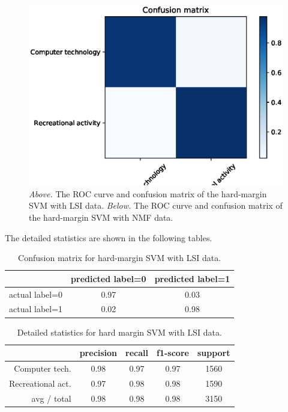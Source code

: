 \documentclass[letterpaper]{article}
\begin{document}
\begin{figure}[!htb]
\begin{minipage}{0.5\textwidth}
\end{minipage}%
\begin{minipage}{0.5\textwidth}
\includegraphics[width=1.0\textwidth]{conf-mat-nmf-hard-svm}
\end{minipage}
\caption{\emph{Above.} The ROC curve and confusion matrix
of the hard-margin SVM with LSI data.
\emph{Below.} The ROC curve and confusion matrix of the hard-margin SVM
with NMF data.}
\label{fig:hard-svm-2}
\end{figure}

The detailed statistics are shown in the following tables.
\begin{table}[H]
\centering
\begin{tabular}{c|cc}
 & predicted label=0 & predicted label=1 \\ \hline
actual label=0 & 0.97 & 0.03 \\
actual label=1 & 0.02 & 0.98 \\
\end{tabular}
\caption{Confusion matrix for hard-margin SVM with LSI data.}
\end{table}

\begin{table}[H]
\centering
\begin{tabular}{r|cccc}
 & precision & recall & f1-score & support \\ \hline
Computer tech. & 0.98 & 0.97 & 0.97 & 1560 \\
Recreational act. & 0.97 & 0.98 & 0.98 & 1590 \\
avg / total & 0.98 & 0.98 & 0.98 & 3150 \\
\end{tabular}
\caption{Detailed statistics for hard margin SVM with LSI data.}
\end{table}
\end{document}
